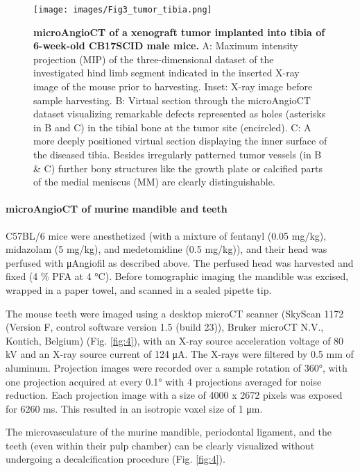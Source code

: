 \begin{figure}
\hypertarget{fig:3}{%
\centering
\texttt{[image: images/Fig3\_tumor\_tibia.png]}
\caption{\textbf{microAngioCT of a xenograft tumor implanted into tibia of 6-week-old CB17SCID male mice.}
A: Maximum intensity projection (MIP) of the three-dimensional dataset of the investigated hind limb segment indicated in the inserted X-ray image of the mouse prior to harvesting.
Inset: X-ray image before sample harvesting.
B: Virtual section through the microAngioCT dataset visualizing remarkable defects represented as holes (asterisks in B and C) in the tibial bone at the tumor site (encircled).
C: A more deeply positioned virtual section displaying the inner surface of the diseased tibia.
Besides irregularly patterned tumor vessels (in B \& C) further bony structures like the growth plate or calcified parts of the medial meniscus (MM) are clearly distinguishable.}\label{fig:3}
}
\end{figure}

\hypertarget{microangioct-of-murine-mandible-and-teeth}{%
\paragraph{microAngioCT of murine mandible and teeth}\label{microangioct-of-murine-mandible-and-teeth}}

C57BL/6 mice were anesthetized (with a mixture of fentanyl (0.05 mg/kg), midazolam (5 mg/kg), and medetomidine (0.5 mg/kg)), and their head was perfused with μAngiofil as described above.
The perfused head was harvested and fixed (4 \% PFA at 4 °C).
Before tomographic imaging the mandible was excised, wrapped in a paper towel, and scanned in a sealed pipette tip.

The mouse teeth were imaged using a desktop microCT scanner (SkyScan 1172 (Version F, control software version 1.5 (build 23)), Bruker microCT N.V., Kontich, Belgium) (Fig. \ref{fig:4}), with an X-ray source acceleration voltage of 80 kV and an X-ray source current of 124 μA.
The X-rays were filtered by 0.5 mm of aluminum.
Projection images were recorded over a sample rotation of 360°, with one projection acquired at every 0.1° with 4 projections averaged for noise reduction.
Each projection image with a size of 4000 x 2672 pixels was exposed for 6260 ms.
This resulted in an isotropic voxel size of 1 μm.

The microvasculature of the murine mandible, periodontal ligament, and the teeth (even within their pulp chamber) can be clearly visualized without undergoing a decalcification procedure (Fig. \ref{fig:4}).

